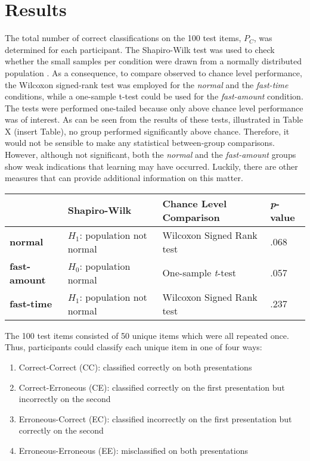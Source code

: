 \section{Results}
The total number of correct classifications on the 100 test items, $P_{C}$, was determined for each participant. The Shapiro-Wilk test was used to check whether the small samples per condition were drawn from a normally distributed population \citep{yazici2007comparison}. As a consequence, to compare observed to chance level performance, the Wilcoxon signed-rank test was employed for the \textit{normal} and the \textit{fast-time} conditions, while a one-sample t-test could be used for the \textit{fast-amount} condition. The tests were performed one-tailed because only above chance level performance was of interest. As can be seen from the results of these tests, illustrated in Table X (insert Table), no group performed significantly above chance. Therefore, it would not be sensible to make any statistical between-group comparisons. However, although not significant, both the \textit{normal} and the \textit{fast-amount} groups show weak indications that learning may have occurred. Luckily, there are other measures that can provide additional information on this matter.\\
\begin{center}
\begin{table}[h]
\begin{tabular}{>{\bfseries}l| l  l l }
\hline
            & \textbf{Shapiro-Wilk} & \textbf{Chance Level Comparison}	& \textbf{\textit{p}-value} \\
\hline
\hline
normal     & $H_{1}$: population not normal & Wilcoxon Signed Rank test    & .068             \\
fast-amount & $H_{0}$: population normal     & One-sample \textit{t}-test  & .057             \\
fast-time  & $H_{1}$: population not normal & Wilcoxon Signed Rank test    & .237       
\end{tabular}
\end{table}
\end{center}
The 100 test items consisted of 50 unique items which were all repeated once. Thus, participants could classify each unique item in one of four ways:
\begin{enumerate}
\item Correct-Correct (CC): classified correctly on both presentations
\item Correct-Erroneous (CE): classified correctly on the first presentation but incorrectly on the second
\item Erroneous-Correct (EC): classified incorrectly on the first presentation but correctly on the second
\item Erroneous-Erroneous (EE): misclassified on both presentations
\end{enumerate}
